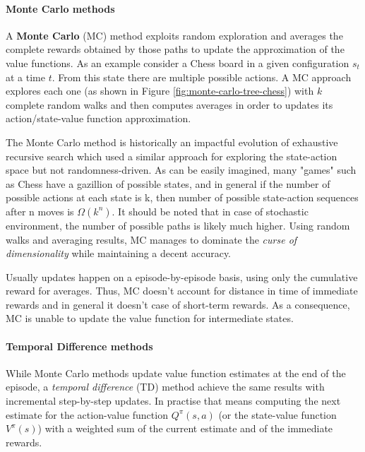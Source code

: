 \paragraph{Monte Carlo methods}

A \textbf{Monte Carlo} (MC) method exploits random exploration and averages the complete rewards obtained by those paths to update the approximation of the value functions.
As an example consider a Chess board in a given configuration $s_t$ at a time $t$. From this state there are multiple possible actions. A MC approach explores each one (as shown in Figure \ref{fig:monte-carlo-tree-chess}) with $k$ complete random walks and then computes averages in order to updates its action/state-value function approximation.

The Monte Carlo method is historically an impactful evolution of exhaustive recursive search which used a similar approach for exploring the state-action space but not randomness-driven. As can be easily imagined, many "games" such as Chess have a gazillion of possible states, and in general if the number of possible actions at each state is k, then number of possible state-action sequences after n moves is $\Omega(k^n)$. It should be noted that in case of stochastic environment, the number of possible paths is likely much higher. Using random walks and averaging results, MC manages to dominate the \textit{curse of dimensionality} while maintaining a decent accuracy.

Usually updates happen on a episode-by-episode basis, using only the cumulative reward for averages. Thus, MC doesn't account for distance in time of immediate rewards and in general it doesn't case of short-term rewards. As a consequence, MC is unable to update the value function for intermediate states.


\paragraph{Temporal Difference methods}

While Monte Carlo methods update value function estimates at the end of the episode, a \textit{temporal difference} (TD) method achieve the same results with incremental step-by-step updates.
In practise that means computing the next estimate for the action-value function $Q^\pi(s, a)$ (or the state-value function $V^\pi(s)$) with a weighted sum of the current estimate and of the immediate rewards.

